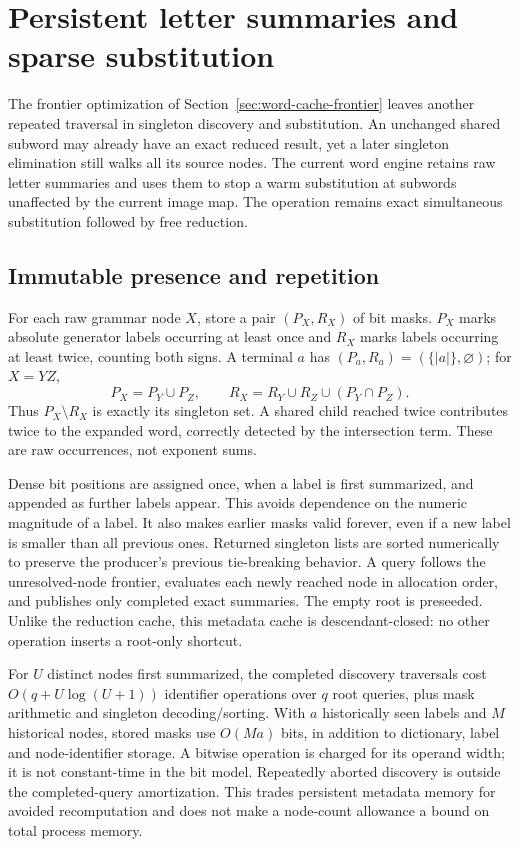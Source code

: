 \section{Persistent letter summaries and sparse substitution}
\label{sec:sparse-substitution}

The frontier optimization of Section~\ref{sec:word-cache-frontier} leaves
another repeated traversal in singleton discovery and substitution. An
unchanged shared subword may already have an exact reduced result, yet a
later singleton elimination still walks all its source nodes. The current
word engine retains raw letter summaries and uses them to stop a warm
substitution at subwords unaffected by the current image map. The operation
remains exact simultaneous substitution followed by free reduction.

\subsection{Immutable presence and repetition}

For each raw grammar node $X$, store a pair $(P_X,R_X)$ of bit masks.
$P_X$ marks absolute generator labels occurring at least once and $R_X$
marks labels occurring at least twice, counting both signs. A terminal $a$
has $(P_a,R_a)=(\{ |a|\},\varnothing)$; for $X=YZ$,
\[
 P_X=P_Y\cup P_Z,\qquad
 R_X=R_Y\cup R_Z\cup(P_Y\cap P_Z).
\]
Thus $P_X\setminus R_X$ is exactly its singleton set. A shared child reached
twice contributes twice to the expanded word, correctly detected by the
intersection term. These are raw occurrences, not exponent sums.

Dense bit positions are assigned once, when a label is first summarized,
and appended as further labels appear. This avoids dependence on the numeric
magnitude of a label. It also makes earlier masks valid forever, even if a
new label is smaller than all previous ones. Returned singleton lists are
sorted numerically to preserve the producer's previous tie-breaking behavior.
A query follows the unresolved-node frontier, evaluates each newly reached
node in allocation order, and publishes only completed exact summaries.
The empty root is preseeded. Unlike the reduction cache, this metadata cache
is descendant-closed: no other operation inserts a root-only shortcut.

For $U$ distinct nodes first summarized, the completed discovery traversals
cost $O(q+U\log(U+1))$ identifier operations over $q$ root queries, plus
mask arithmetic and singleton decoding/sorting. With $a$ historically seen
labels and $M$ historical nodes, stored masks use $O(Ma)$ bits, in addition
to dictionary, label and node-identifier storage. A bitwise operation is
charged for its operand width; it is not constant-time in the bit model.
Repeatedly aborted discovery is outside the completed-query amortization.
This trades persistent metadata memory for avoided recomputation and does
not make a node-count allowance a bound on total process memory.

